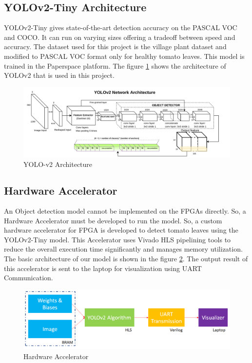 \documentclass[a4paper,12pt,oneside]{book}
\begin{document}
\subsection*{YOLOv2-Tiny Architecture}
YOLOv2-Tiny gives state-of-the-art detection accuracy on the PASCAL VOC and COCO. It can run on varying sizes offering a tradeoff between speed and accuracy. The dataset used for this project is the village plant dataset and modified to PASCAL VOC format only for healthy tomato leaves. This model is trained in the Paperspace platform. The figure \ref{figure:yolov2} shows the architecture of YOLOv2 that is used in this project.
\begin{figure}[h!]
    \centering
    \includegraphics[scale=0.21]{images/yolov2-architecture.png}
    \caption{YOLO-v2 Architecture}
    \label{figure:yolov2}
\end{figure}

\subsection*{Hardware Accelerator}
An Object detection model cannot be implemented on the FPGAs directly. So, a Hardware Accelerator must be developed to run the model. So, a custom hardware accelerator for FPGA is developed to detect tomato leaves using the YOLOv2-Tiny model. This Accelerator uses Vivado HLS pipelining tools to reduce the overall execution time significantly and manages memory utilization. The basic architecture of our model is shown in the figure \ref{figure:architecturetop}. The output result of this accelerator is sent to the laptop for visualization using UART Communication.
\begin{figure}[h!]
    \centering
    \includegraphics[scale=0.3]{images/architecturetop.png}
    \caption{Hardware Accelerator}
    \label{figure:architecturetop}
\end{figure}
\end{document}
